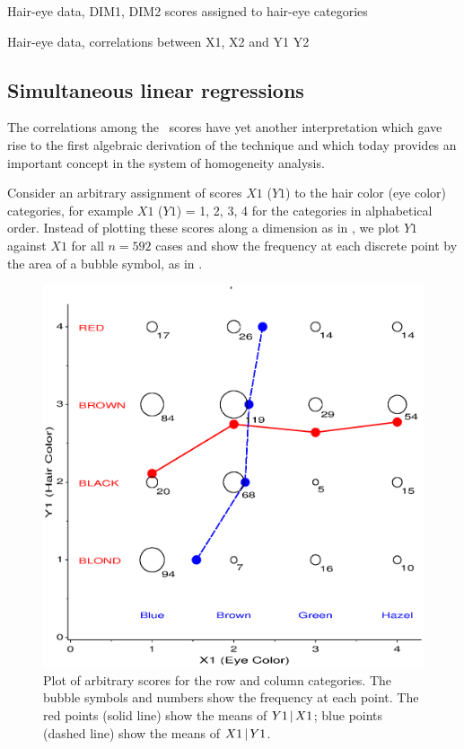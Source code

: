 \begin{Output}[htb]
\caption{Hair-eye data, DIM1, DIM2 scores assigned to hair-eye categories}\label{out:cascores.1}
\small

\end{Output}

\begin{Output}[htb]
\caption{Hair-eye data, correlations between X1, X2 and Y1 Y2}\label{out:cascores.2}
\small

\end{Output}

\subsection{Simultaneous linear regressions}
The correlations among the \CA\ scores have yet another interpretation which gave
rise to the first algebraic derivation of the technique
\citep{Hirschfeld:35} and which today provides an important concept in the
\citet{Gifi:90} system of homogeneity analysis.

Consider an arbitrary assignment of scores $X1$ ($Y1$) to the hair color
(eye color) categories, for example $X1$ ($Y1$) = 1, 2, 3, 4 for the
categories in alphabetical order.
Instead of plotting these scores along a dimension as in , we plot $Y1$ against $X1$ for all $n = 592$
cases and show the frequency at each discrete point by the area of
a bubble symbol, as in .

\begin{figure}[htb]
  \centering
  \includegraphics[scale=.6,clip]{ch5/fig/cascore0}
  \caption[Plot of arbitrary scores for the row and column categories]{Plot of arbitrary scores for the row and column categories.
The bubble symbols and numbers show the frequency at each point.
The red points (solid line) show the means of $Y1\, | \, X1$; blue points (dashed line) show the means of $X1\, | \, Y1$.}\label{fig:cascore0}
\end{figure}

